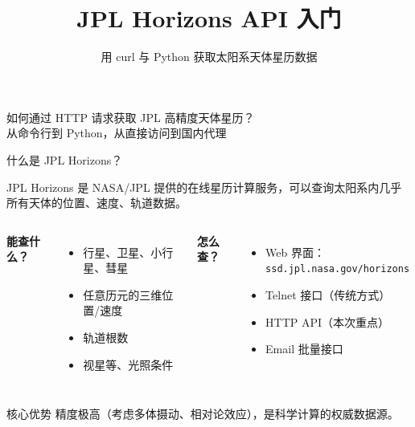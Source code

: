 \documentclass[aspectratio=169]{ctexbeamer}
\title{JPL Horizons API 入门}
\subtitle{用 curl 与 Python 获取太阳系天体星历数据}
\author{}
\date{}
\begin{document}
\begin{frame}
  \titlepage
  \vspace{-0.6cm}
  \begin{center}
    \large 如何通过 HTTP 请求获取 JPL 高精度天体星历？\\[4pt]
    \normalsize 从命令行到 Python，从直接访问到国内代理
  \end{center}
\end{frame}

\begin{frame}{什么是 JPL Horizons？}
\large

JPL Horizons 是 NASA/JPL 提供的\alert{在线星历计算服务}，可以查询太阳系内几乎所有天体的位置、速度、轨道数据。

\vspace{0.3cm}

\begin{columns}[T]
\textbf{能查什么？}
\begin{itemize}
  \item 行星、卫星、小行星、彗星
  \item 任意历元的三维位置/速度
  \item 轨道根数
  \item 视星等、光照条件
\end{itemize}

\textbf{怎么查？}
\begin{itemize}
  \item Web 界面：\texttt{ssd.jpl.nasa.gov/horizons}
  \item Telnet 接口（传统方式）
  \item HTTP API（本次重点）
  \item Email 批量接口
\end{itemize}
\end{columns}

\vspace{0.2cm}

\begin{alertblock}{核心优势}
  精度极高（考虑多体摄动、相对论效应），是科学计算的权威数据源。
\end{alertblock}
\end{frame}
\end{document}
